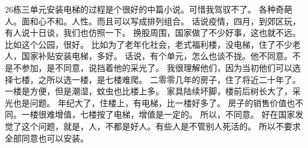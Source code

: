 \documentclass{article}   %
\begin{document}
	26栋三单元安装电梯的过程是个很好的中篇小说。可惜我驾驭不了。
各种奇葩人。面和心不和。人性。而且可以写成排列组合。
话说疫情，四月，到郊区玩，有人说十日谈，我们也仿照一下。
换股周围，国家做了不少好事，这也就不远。比如这个公园，很好。
比如为了老年化社会，老式福利楼，没电梯，住了不少老人，国家补贴安装电梯，多好。
话说，有个单元，怎么也谈不拢。他不同意。不是不参加，是不同意，说挡着他的采光了。
我很理解他们，因为当初他们可以选择七楼，之所以选一楼，是七楼难爬。
二零零几年的房子，住了将近二十年了。一楼是方便，但是潮湿，蚊虫也比楼上多。
家具陆续坏脚，楼前后树长大了，采光也是问题。
年纪大了，住楼上，有电梯，比一楼好多了。
房子的销售价值也不同。一楼很难增值，七楼按了电梯，增值是一定的。
所以，不同意。
好在国家发觉了这个问题，就是，人，不都是好人。有些人是不管别人死活的。
所以不要求全部同意也可以安装。
\end{document}
